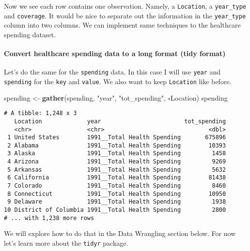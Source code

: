 \documentclass[]{article}
\newenvironment{Shaded}{\begin{snugshade}}{\end{snugshade}}
\newcommand{\KeywordTok}[1]{\textcolor[rgb]{0.13,0.29,0.53}{\textbf{#1}}}
\newcommand{\NormalTok}[1]{#1}
\newcommand{\OperatorTok}[1]{\textcolor[rgb]{0.81,0.36,0.00}{\textbf{#1}}}
\newcommand{\StringTok}[1]{\textcolor[rgb]{0.31,0.60,0.02}{#1}}
\let\oldparagraph\paragraph
\renewcommand{\paragraph}[1]{\oldparagraph{#1}\mbox{}}
\begin{document}
Now we see each row contains one observation. Namely, a
\texttt{Location}, a \texttt{year\_type} and \texttt{coverage}. It would
be nice to separate out the information in the \texttt{year\_type}
column into two columns. We can implement same techniques to the
healthcare spending dataset.

\hypertarget{convert-healthcare-spending-data-to-a-long-format-tidy-format}{%
\paragraph{Convert healthcare spending data to a long format (tidy
format)}\label{convert-healthcare-spending-data-to-a-long-format-tidy-format}}

Let's do the same for the \texttt{spending} data. In this case I will
use \texttt{year} and \texttt{spending} for the \texttt{key} and
\texttt{value}. We also want to keep \texttt{Location} like before.

\begin{Shaded}
\begin{Highlighting}[]
\NormalTok{spending <-}\StringTok{ }\KeywordTok{gather}\NormalTok{(spending, }\StringTok{"year"}\NormalTok{, }\StringTok{"tot_spending"}\NormalTok{, }\OperatorTok{-}\NormalTok{Location)}
\NormalTok{spending}
\end{Highlighting}
\end{Shaded}

\begin{verbatim}
# A tibble: 1,248 x 3
   Location             year                        tot_spending
   <chr>                <chr>                              <dbl>
 1 United States        1991__Total Health Spending       675896
 2 Alabama              1991__Total Health Spending        10393
 3 Alaska               1991__Total Health Spending         1458
 4 Arizona              1991__Total Health Spending         9269
 5 Arkansas             1991__Total Health Spending         5632
 6 California           1991__Total Health Spending        81438
 7 Colorado             1991__Total Health Spending         8460
 8 Connecticut          1991__Total Health Spending        10950
 9 Delaware             1991__Total Health Spending         1938
10 District of Columbia 1991__Total Health Spending         2800
# ... with 1,238 more rows
\end{verbatim}

We will explore how to do that in the Data Wrangling section below. For
now let's learn more about the \texttt{tidyr} package.
\end{document}
